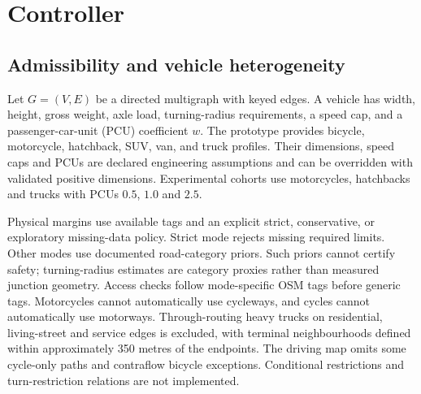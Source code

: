 \documentclass[sigconf,anonymous,review]{acmart}
\begin{document}
\section{Controller}
\subsection{Admissibility and vehicle heterogeneity}
Let $G=(V,E)$ be a directed multigraph with keyed edges. A vehicle has width, height, gross weight, axle load, turning-radius requirements, a speed cap, and a passenger-car-unit (PCU) coefficient $w$. The prototype provides bicycle, motorcycle, hatchback, SUV, van, and truck profiles. Their dimensions, speed caps and PCUs are declared engineering assumptions and can be overridden with validated positive dimensions. Experimental cohorts use motorcycles, hatchbacks and trucks with PCUs $0.5$, $1.0$ and $2.5$.

Physical margins use available tags and an explicit strict, conservative, or exploratory missing-data policy. Strict mode rejects missing required limits. Other modes use documented road-category priors. Such priors cannot certify safety; turning-radius estimates are category proxies rather than measured junction geometry. Access checks follow mode-specific OSM tags before generic tags. Motorcycles cannot automatically use cycleways, and cycles cannot automatically use motorways. Through-routing heavy trucks on residential, living-street and service edges is excluded, with terminal neighbourhoods defined within approximately 350 metres of the endpoints. The driving map omits some cycle-only paths and contraflow bicycle exceptions. Conditional restrictions and turn-restriction relations are not implemented.
\end{document}
